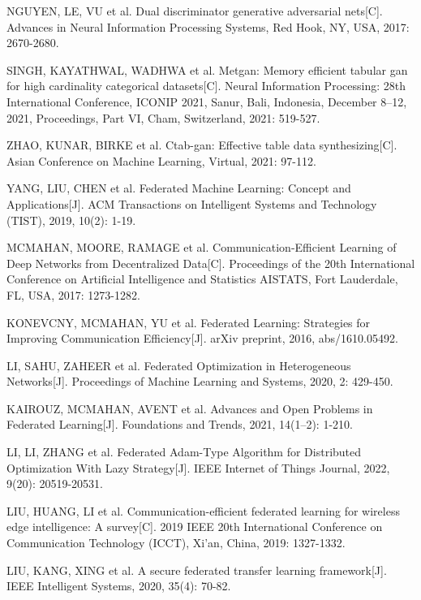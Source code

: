 \begin{thebibliography}{200}
	NGUYEN, LE, VU et al. Dual discriminator generative adversarial nets[C]. Advances in Neural Information Processing Systems, Red Hook, NY, USA, 2017: 2670-2680.

	SINGH, KAYATHWAL, WADHWA et al. Metgan: Memory efficient tabular gan for high cardinality categorical datasets[C]. Neural Information Processing: 28th International Conference, ICONIP 2021, Sanur, Bali, Indonesia, December 8--12, 2021, Proceedings, Part VI, Cham, Switzerland, 2021: 519-527.

	ZHAO, KUNAR, BIRKE et al. Ctab-gan: Effective table data synthesizing[C]. Asian Conference on Machine Learning, Virtual, 2021: 97-112.

	YANG, LIU, CHEN et al. Federated Machine Learning: Concept and Applications[J]. ACM Transactions on Intelligent Systems and Technology (TIST), 2019, 10(2): 1-19.

	MCMAHAN, MOORE, RAMAGE et al. Communication-Efficient Learning of Deep Networks from Decentralized Data[C]. Proceedings of the 20th International Conference on Artificial Intelligence and Statistics AISTATS, Fort Lauderdale, FL, USA, 2017: 1273-1282.

	KONEVCNY, MCMAHAN, YU et al. Federated Learning: Strategies for Improving Communication Efficiency[J]. arXiv preprint, 2016, abs/1610.05492.

	LI, SAHU, ZAHEER et al. Federated Optimization in Heterogeneous Networks[J]. Proceedings of Machine Learning and Systems, 2020, 2: 429-450.

	KAIROUZ, MCMAHAN, AVENT et al. Advances and Open Problems in Federated Learning[J]. Foundations and Trends\textregistered, 2021, 14(1--2): 1-210.

	LI, LI, ZHANG et al. Federated Adam-Type Algorithm for Distributed Optimization With Lazy Strategy[J]. IEEE Internet of Things Journal, 2022, 9(20): 20519-20531.

	LIU, HUANG, LI et al. Communication-efficient federated learning for wireless edge intelligence: A survey[C]. 2019 IEEE 20th International Conference on Communication Technology (ICCT), Xi'an, China, 2019: 1327-1332.

	LIU, KANG, XING et al. A secure federated transfer learning framework[J]. IEEE Intelligent Systems, 2020, 35(4): 70-82.


\end{thebibliography}
